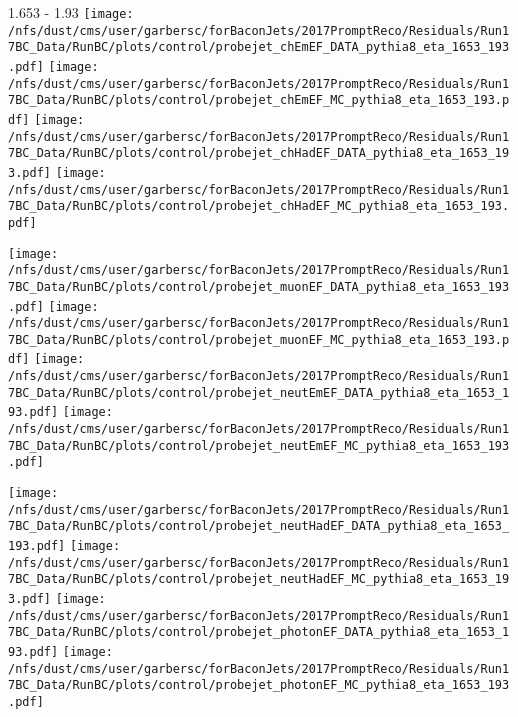 \documentclass[t,compress]{beamer}
\begin{document}
\begin{frame}{1.653 - 1.93}
	\texttt{[image: /nfs/dust/cms/user/garbersc/forBaconJets/2017PromptReco/Residuals/Run17BC\_Data/RunBC/plots/control/probejet\_chEmEF\_DATA\_pythia8\_eta\_1653\_193.pdf]}
	\texttt{[image: /nfs/dust/cms/user/garbersc/forBaconJets/2017PromptReco/Residuals/Run17BC\_Data/RunBC/plots/control/probejet\_chEmEF\_MC\_pythia8\_eta\_1653\_193.pdf]}
	\texttt{[image: /nfs/dust/cms/user/garbersc/forBaconJets/2017PromptReco/Residuals/Run17BC\_Data/RunBC/plots/control/probejet\_chHadEF\_DATA\_pythia8\_eta\_1653\_193.pdf]}
	\texttt{[image: /nfs/dust/cms/user/garbersc/forBaconJets/2017PromptReco/Residuals/Run17BC\_Data/RunBC/plots/control/probejet\_chHadEF\_MC\_pythia8\_eta\_1653\_193.pdf]}
\newline

\vspace{-0.65cm}
	\texttt{[image: /nfs/dust/cms/user/garbersc/forBaconJets/2017PromptReco/Residuals/Run17BC\_Data/RunBC/plots/control/probejet\_muonEF\_DATA\_pythia8\_eta\_1653\_193.pdf]}
	\texttt{[image: /nfs/dust/cms/user/garbersc/forBaconJets/2017PromptReco/Residuals/Run17BC\_Data/RunBC/plots/control/probejet\_muonEF\_MC\_pythia8\_eta\_1653\_193.pdf]}
	\texttt{[image: /nfs/dust/cms/user/garbersc/forBaconJets/2017PromptReco/Residuals/Run17BC\_Data/RunBC/plots/control/probejet\_neutEmEF\_DATA\_pythia8\_eta\_1653\_193.pdf]}
	\texttt{[image: /nfs/dust/cms/user/garbersc/forBaconJets/2017PromptReco/Residuals/Run17BC\_Data/RunBC/plots/control/probejet\_neutEmEF\_MC\_pythia8\_eta\_1653\_193.pdf]}
\newline

\vspace{-0.65cm}
	\texttt{[image: /nfs/dust/cms/user/garbersc/forBaconJets/2017PromptReco/Residuals/Run17BC\_Data/RunBC/plots/control/probejet\_neutHadEF\_DATA\_pythia8\_eta\_1653\_193.pdf]}
	\texttt{[image: /nfs/dust/cms/user/garbersc/forBaconJets/2017PromptReco/Residuals/Run17BC\_Data/RunBC/plots/control/probejet\_neutHadEF\_MC\_pythia8\_eta\_1653\_193.pdf]}
	\texttt{[image: /nfs/dust/cms/user/garbersc/forBaconJets/2017PromptReco/Residuals/Run17BC\_Data/RunBC/plots/control/probejet\_photonEF\_DATA\_pythia8\_eta\_1653\_193.pdf]}
	\texttt{[image: /nfs/dust/cms/user/garbersc/forBaconJets/2017PromptReco/Residuals/Run17BC\_Data/RunBC/plots/control/probejet\_photonEF\_MC\_pythia8\_eta\_1653\_193.pdf]}
\end{frame}
\end{document}
